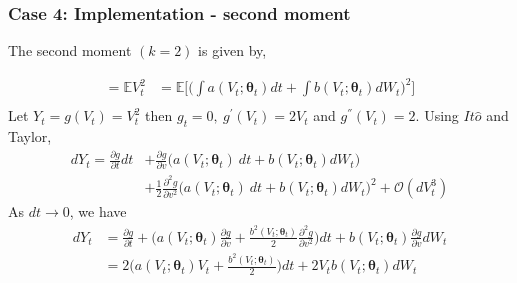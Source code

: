 \documentclass[aspectratio=169]{beamer}\usepackage[utf8]{inputenc}
\newcommand{\E}{\mathbb{E}}
\begin{document}
\begin{frame}\frametitle{ Case 4: Implementation - second moment }
The second moment $(k=2)$ is given by,

\begin{equation}
\begin{split}
  =\E V_t^2 &=  \E \Big[ \Big( \int a(V_t; \bm{\theta}_t) dt + \int b (V_t; \bm{\theta}_t ) dW_t \Big)^2 \Big] \\
\end{split}\label{main_V_2_moment}
\end{equation}
Let $Y_t=g(V_t)=V_t^2$ then $g_t= 0 , \ g^{'} (V_t) = 2V_t$ and $g^{''} (V_t) = 2$. Using $It\hat{o}$ and Taylor, 
\begin{equation}
\begin{split}
dY_t =  \frac{\partial g}{\partial t} dt &+  \frac{\partial g}{\partial v} \Big(a (V_t; \bm{\theta}_t ) \ dt + b (V_t; \bm{\theta}_t ) dW_t  \Big)\\
& + \frac{1}{2} \frac{\partial^2 g}{\partial v^2} \Big(a (V_t; \bm{\theta}_t ) \ dt + b (V_t; \bm{\theta}_t ) dW_t  \Big)^2 + \mathcal{O}(dV_t^3)
\end{split}
\end{equation}
As $dt \to 0$, we have
\begin{equation}
\begin{split}
dY_t &=  \frac{\partial g}{\partial t} + \Big( a (V_t; \bm{\theta}_t ) \frac{\partial g}{\partial v}  + \frac{b^2 (V_t; \bm{\theta}_t )}{2} \frac{\partial^2 g}{\partial v^2} \Big) dt + b (V_t; \bm{\theta}_t ) \frac{\partial g}{\partial v} dW_t  \\
&= 2\Big( a (V_t; \bm{\theta}_t ) V_t  + \frac{b^2 (V_t; \bm{\theta}_t )}{2}  \Big) dt +  2V_t b (V_t; \bm{\theta}_t ) dW_t
\end{split}
\end{equation}

\end{frame}
\end{document}
